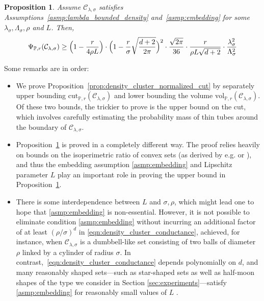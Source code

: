 \documentclass[11pt,twoside]{article}
\newtheorem{proposition}{Proposition}
\theoremstyle{definition}
\newcommand{\1}{\mathbf{1}}
\newcommand{\mc}[1]{\mathcal{#1}}
\newcommand{\Pbb}{\mathbb{P}}
\newcommand{\vol}{\mathrm{vol}}
\newcommand{\cut}{\mathrm{cut}}
\begin{document}
\begin{proposition}
	\label{prop:density_cluster_conductance}
	Assume $\mc{C}_{\lambda,\sigma}$ satisfies Assumptions~\ref{asmp:lambda_bounded_density} and~\ref{asmp:embedding} for some $\lambda_{\sigma}, \Lambda_{\sigma}, \rho$ and $L$. Then,
	\begin{equation}
	\label{eqn:density_cluster_conductance}
	\Psi_{\Pbb,r}(\mc{C}_{\lambda,\sigma}) \geq \Bigl(1 - \frac{r}{4\rho L}\Bigr) \cdot \Bigl(1 - \frac{r}{\sigma}\sqrt{\frac{d + 2}{2\pi}}\Bigr)^2 \cdot \frac{\sqrt{2\pi}}{36} \cdot \frac{r}{\rho L \sqrt{d + 2}} \cdot \frac{\lambda_{\sigma}^2}{\Lambda_{\sigma}^2}
	\end{equation}
\end{proposition}
Some remarks are in order:
\begin{itemize}
	\item We prove Proposition~\ref{prop:density_cluster_normalized_cut} by separately upper bounding $\cut_{\Pbb,r}(\mc{C}_{\lambda,\sigma})$ and lower bounding the volume $\vol_{\Pbb,r}(\mc{C}_{\lambda,\sigma})$. Of these two bounds, the trickier to prove is the upper bound on the cut, which involves carefully estimating the probability mass of thin tubes around the boundary of $\mc{C}_{\lambda,\sigma}$. 
	\item Proposition~\ref{prop:density_cluster_conductance} is proved in a completely different way. The proof relies heavily on bounds on the isoperimetric ratio of convex sets (as derived by e.g. \cite{lovasz1990} or \cite{dyer1991}), and thus the embedding assumption \ref{asmp:embedding} and Lipschitz parameter $L$
	play an important role in proving the upper bound in Proposition~\ref{prop:density_cluster_conductance}. 
	\item There is some interdependence between $L$ and $\sigma,\rho$, which might lead one to hope that \ref{asmp:embedding} is
	non-essential. However, it is not possible to eliminate condition \ref{asmp:embedding} without incurring an additional factor of at least
	$(\rho/\sigma)^d$ in \eqref{eqn:density_cluster_conductance}, achieved, for
	instance, when $\mc{C}_{\lambda,\sigma}$ is a dumbbell-like set consisting of two balls of diameter $\rho$ linked by a cylinder of radius $\sigma$. In contrast,~\eqref{eqn:density_cluster_conductance} depends polynomially on $d$, and many reasonably shaped sets---such as star-shaped sets as well as half-moon shapes of the type we consider in Section \ref{sec:experiments}---satisfy \ref{asmp:embedding} for reasonably small values of $L$ \citep{abbasi-yadkori2016a, abbasi-yadkori2016}.
\end{itemize}
\end{document}
